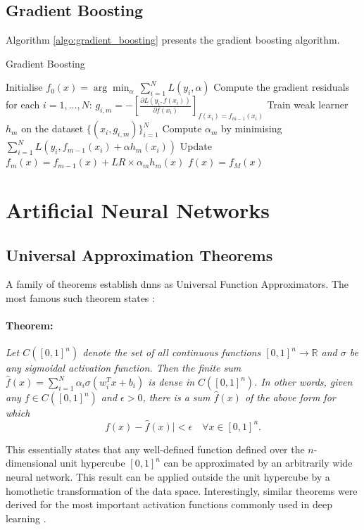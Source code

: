 \subsection{Gradient Boosting}
Algorithm \ref{algo:gradient_boosting} presents the gradient boosting algorithm. 
\begin{algorithm}
    \caption{Gradient Boosting \cite{MurphyML}}
    \label{algo:gradient_boosting}
    \begin{algorithmic}
    \State Initialise $f_0(x) = \arg\min_\alpha \,\sum_{i=1}^N L(y_i, \alpha)$
        \State Compute the gradient residuals for each $i= 1, ..., N$: $g_{i,m} = -\left[\frac{\partial L(y_i, f(x_i))}{\partial f(x_i)}\right]_{f(x_i) = f_{m-1}(x_i)}$
        \State Train weak learner $h_m$ on the dataset $\{(x_i, g_{i,m})\}_{i=1}^N$
        \State Compute $\alpha_m$ by minimising $\sum_{i=1}^N L(y_i, f_{m-1}(x_i) + \alpha h_m(x_i))$
        \State Update $f_m(x) = f_{m-1}(x) + LR \times \alpha_m h_m(x)$
    \EndFor
    \State \Return $f(x) = f_M(x)$
    \end{algorithmic}
\end{algorithm}


\section{Artificial Neural Networks}\label{app:dnn_uni_approx}
\subsection{Universal Approximation Theorems}
A family of theorems establish \glspl{dnn} as Universal Function Approximators. The most famous such theorem states \cite{universalFuncApproxNN,HORNIK1989359}:

\paragraph{Theorem:} \textit{Let $C([0, 1]^n)$ denote the set of all continuous functions $[0, 1]^n \rightarrow \mathbb{R}$ and $\sigma$ be any sigmoidal activation function. Then the finite sum $\hat{f}(x) = \sum_{i=1}^N \alpha_i \sigma(w_i^T x + b_i)$ is dense in $C([0, 1]^n)$. In other words, given any $f \in C([0, 1]^n)$ and $\epsilon > 0$, there is a sum $\hat{f}(x)$ of the above form for which \[ f(x) - \hat{f}(x)| < \epsilon \quad \forall x \in [0, 1]^n.\]}

This essentially states that any well-defined function defined over the $n$-dimensional unit hypercube $[0, 1]^n$ can be approximated by an arbitrarily wide neural network. This result can be applied outside the unit hypercube by a homothetic transformation of the data space. Interestingly, similar theorems were derived for the most important activation functions commonly used in deep learning \cite{universApproximator-Relu}.

